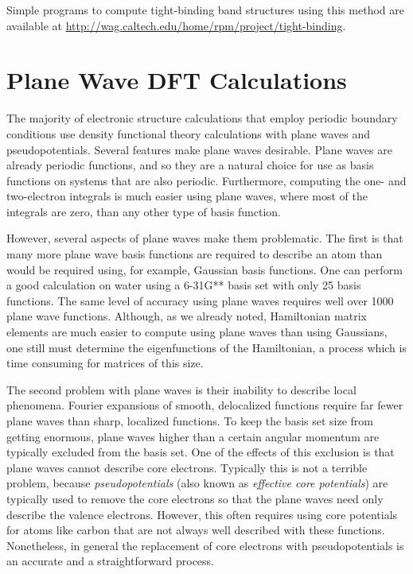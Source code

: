 Simple programs to compute tight-binding band structures using this
method are available at 
\href{http://wag.caltech.edu/home/rpm/project/tight-binding}
     {http://wag.caltech.edu/home/rpm/project/tight-binding}.


\section{Plane Wave DFT Calculations}
The majority of electronic structure calculations that employ periodic
boundary conditions use density functional theory calculations with
plane waves and pseudopotentials. Several features make plane waves
desirable. Plane waves are already periodic functions, and so they are
a natural choice for use as basis functions on systems that are also
periodic. Furthermore, computing the one- and two-electron integrals
is much easier using plane waves, where most of the integrals are
zero, than any other type of basis function. 

However, several aspects of plane waves make them problematic. The
first is that many more plane wave basis functions are required to
describe an atom than would be required using, for example, Gaussian
basis functions. One can perform a good calculation on water using a
6-31G** basis set with only 25 basis functions. The same level of
accuracy using plane waves requires well over 1000 plane wave
functions. Although, as we already noted, Hamiltonian matrix elements
are much easier to compute using plane waves than using Gaussians, one
still must determine the eigenfunctions of the Hamiltonian, a process
which is time consuming for matrices of this size.

The second problem with plane waves is their inability to describe
local phenomena. Fourier expansions of smooth, delocalized functions
require far fewer plane waves than sharp, localized functions. To keep
the basis set size from getting enormous, plane waves higher than a
certain angular momentum are typically excluded from the basis
set. One of the effects of this exclusion is that plane waves cannot
describe core electrons. Typically this is not a terrible problem,
because \emph{pseudopotentials} (also known as \emph{effective core
potentials}) are typically used to remove the core electrons so that
the plane waves need only describe the valence electrons. However,
this often requires using core potentials for atoms like carbon that
are not always well described with these functions. Nonetheless, in
general the replacement of core electrons with pseudopotentials is an
accurate and a straightforward process. 

